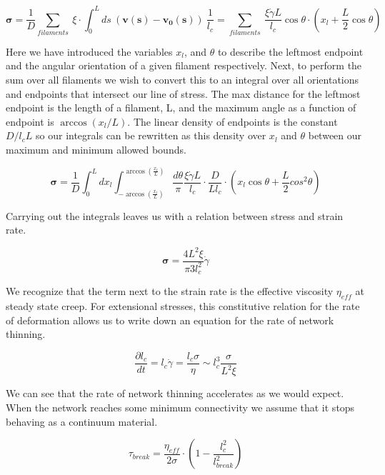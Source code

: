 \documentclass[prb,11pt]{revtex4-1}
\begin{document}
\begin{equation}
\mathbf{\sigma} =  \frac{1}{D}\sum_{filaments}\:  \xi \cdot \int_0^L ds \: (\mathbf{v(s)}-\mathbf{v_0(s)}) \:\frac{1}{l_c} = \sum_{filaments}\:  \frac{\xi \dot \gamma L}{l_c} \cos \theta \cdot (x_l + \frac{L}{2} \cos \theta)
\end{equation}

Here we have introduced the variables $x_l$, and $\theta$ to describe the leftmost endpoint and the angular orientation of a given filament respectively.  Next, to perform the sum over all filaments we wish to convert this to an integral over all orientations and endpoints that intersect our line of stress. The max distance for the leftmost endpoint is the length of a filament, L, and the maximum angle as a function of endpoint is $\arccos(x_l/L)$.  The linear density of endpoints is the constant $D/l_cL$ so our integrals can be rewritten as this density over $x_l$ and $\theta$ between our maximum and minimum allowed bounds.

\begin{equation}
\mathbf{\sigma} =  \frac{1}{D} \int_0^L dx_l \int_{-\arccos (\frac{x_l}{L})}^{\arccos (\frac{x_l}{L})}\frac{d\theta}{\pi} \frac{\xi \dot \gamma L}{l_c} \cdot \frac{D}{Ll_c}\cdot (x_l \cos \theta + \frac{L}{2} cos^2\theta)
\end{equation}

Carrying out the integrals leaves us with a relation between stress and strain rate.

\begin{equation}
\mathbf{\sigma} = \frac{4L^2 \xi}{\pi3l_c^2} \dot \gamma \end{equation}

We recognize that the term next to the strain rate is the effective viscosity $\eta_{eff}$ at steady state creep.  For extensional stresses, this constitutive relation for the rate of deformation allows us to write down an equation for the rate of network thinning.  

\begin{equation}
\frac{\partial l_c}{dt}=l_c\dot \gamma =\frac{l_c \sigma}{\eta}\sim l_c^3\frac{ \sigma}{L^2 \xi}
\end{equation}

We can see that the rate of network thinning accelerates as we would expect.  When the network reaches some minimum connectivity we assume that it stops behaving as a continuum material.  

\begin{equation}
\tau_{break} = \frac{\eta_{eff}}{2\sigma}\cdot\left ( 1 -\frac{l_c^2}{l_{break}^2} \right )
\end{equation}
\end{document}
